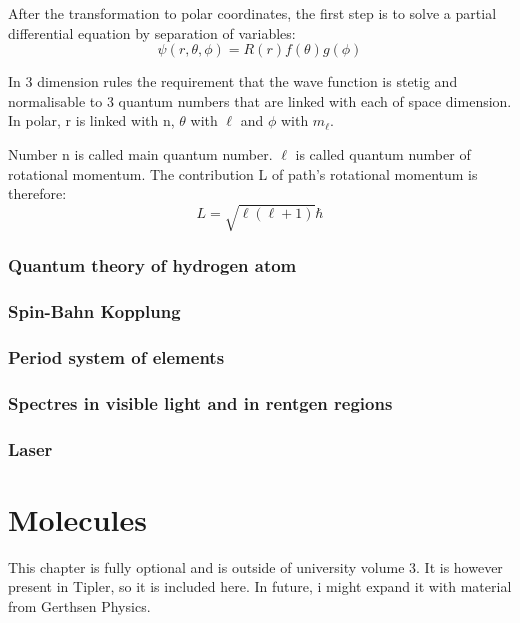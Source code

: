 \documentclass{report}
\begin{document}
After the transformation to polar coordinates, the first step is to solve a partial differential equation by separation of variables:
\begin{equation}
    \psi (r, \theta, \phi) = R(r) f(\theta) g(\phi)
\end{equation}

In 3 dimension rules the requirement that the wave function is stetig and normalisable to 3 quantum numbers that are linked with each of space dimension. In polar, r is linked with n, $\theta$ with $\ell$ and $\phi$ with $m_{\ell}$.

Number n is called main quantum number. $\ell$ is called quantum number of rotational momentum. The contribution L of path's rotational momentum is therefore:
\begin{equation}
    L = \sqrt{\ell(\ell+1)}\hbar
\end{equation}

\section{Quantum theory of hydrogen atom}
\section{Spin-Bahn Kopplung}
\section{Period system of elements}
\section{Spectres in visible light and in rentgen regions}
\section{Laser}

\part{Molecules}
This chapter is fully optional and is outside of university volume 3. It is however present in Tipler, so it is included here. In future, i might expand it with material from Gerthsen Physics.
\end{document}
